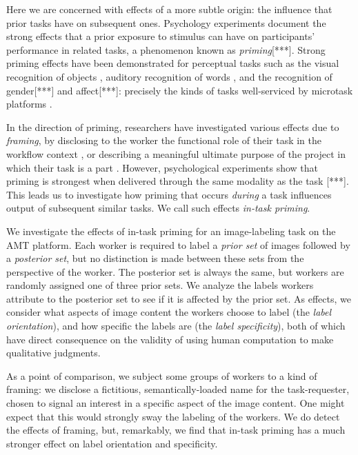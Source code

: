 \documentclass[a4paper]{report}
\begin{document}
Here we are concerned with effects of a more subtle origin: the influence that
prior tasks have on subsequent ones.  Psychology experiments document the 
strong effects that a prior exposure to stimulus can have on participants' 
performance in related tasks, a phenomenon known as \textit{priming}[***].  
Strong 
priming effects have been demonstrated for
perceptual tasks such as the visual recognition of 
objects \cite{BJOP:BJOP1796},
auditory recognition of words \cite{BJOP:BJOP1826}, and the recognition
of gender[***] and affect[***]: precisely the kinds of tasks well-serviced by 
microtask platforms \cite{yuen2011survey, snow2008cheap}.  

In the direction of priming, researchers have investigated various effects 
due to \textit{framing}, by disclosing to the worker the functional role of
their task in the workflow context \cite{Kinnaird2012281}, 
or describing a meaningful ultimate purpose of the project in which their
task is a part \cite{chandler2013breaking}.
However, psychological experiments show that priming is strongest when 
delivered through the same modality as the task [***].  This leads us to 
investigate how priming that occurs \textit{during} a task influences output
of subsequent similar tasks. We call such effects \textit{in-task priming}.  

We investigate the effects of in-task priming for an image-labeling task
on the AMT platform.  Each worker is required to label a \textit{prior set} of
images followed by a \textit{posterior set}, but no distinction is made between
these sets from the perspective of the worker.  The posterior set is
always the same, but workers are randomly assigned one of three prior sets.
We analyze the labels workers attribute to the posterior set to see if it is 
affected by the prior set.  As effects, we consider what aspects of image 
content the workers choose to label (the \textit{label orientation}), and how 
specific the labels are (the \textit{label specificity}), both of which have 
direct consequence on the validity of using human computation to make 
qualitative judgments.

As a point of comparison, we subject some groups of workers to a kind of
framing: we disclose a fictitious, semantically-loaded name for the 
task-requester, chosen to signal an interest in a specific aspect of the 
image content.  One might expect that this would strongly sway the labeling 
of the workers.  We do detect the effects of framing, but, remarkably, we find 
that in-task priming has a much stronger effect on label orientation and 
specificity.  
\end{document}
